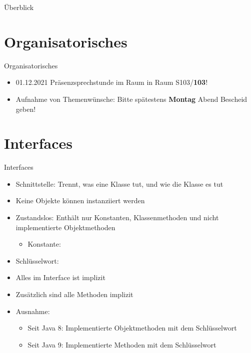 \documentclass{../tuda-beamer}
\date{24. November 2021}
\begin{document}
  \maketitle

  \begin{frame}{Überblick}
    \tableofcontents
  \end{frame}


  \section{Organisatorisches}
  \begin{frame}{Organisatorisches}
    \begin{itemize}
      \item 01.12.2021 Präsenzsprechstunde im Raum in Raum S103/\textbf{103}!
      \item Aufnahme von Themenwünsche: Bitte spätestens \textbf{Montag} Abend Bescheid geben!
    \end{itemize}
  \end{frame}


  \section{Interfaces}
  \begin{frame}{Interfaces}
    \begin{itemize}
      \item Schnittstelle: Trennt, was eine Klasse tut, und wie die Klasse es tut
      \item Keine Objekte können instanziiert werden
      \item Zustandslos: Enthält nur Konstanten, Klassenmethoden und nicht implementierte
      Objektmethoden
      \begin{itemize}
        \item Konstante: 
      \end{itemize}
      \item Schlüsselwort: 
      \item Alles im Interface ist implizit 
      \item Zusätzlich sind alle Methoden implizit 
      \item Ausnahme:
      \begin{itemize}
        \item Seit Java 8: Implementierte Objektmethoden mit dem Schlüsselwort 
        \item Seit Java 9: Implementierte Methoden mit dem Schlüsselwort 
      \end{itemize}
    \end{itemize}
  \end{frame}
\end{document}
